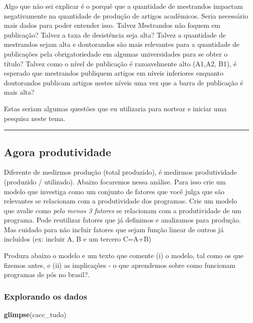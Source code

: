 \documentclass[
]{article}
\newenvironment{Shaded}{\begin{snugshade}}{\end{snugshade}}
\newcommand{\FunctionTok}[1]{\textcolor[rgb]{0.13,0.29,0.53}{\textbf{#1}}}
\newcommand{\NormalTok}[1]{#1}
\begin{document}
Algo que não sei explicar é o porquê que a quantidade de mestrandos
impactam negativamente na quantidade de produção de artigos acadêmicos.
Seria necessário mais dados para poder entender isso. Talvez Mestrandos
não foquem em publicação? Talvez a taxa de desistência seja alta? Talvez
a quantidade de mestrandos sejam alta e doutorandos são mais relevantes
para a quantidade de publicações pela obrigatoriedade em algumas
universidades para se obter o título? Talvez como o nível de publicação
é razoavelmente alto (A1,A2, B1), é esperado que mestrandos publiquem
artigos em níveis inferiores enquanto doutorandos publicam artigos
nestes níveis uma vez que a barra de publicação é mais alta?

Estas seriam algumas questões que eu utilizaria para nortear e iniciar
uma pesquisa neste tema.

\begin{center}\rule{0.5\linewidth}{0.5pt}\end{center}

\hypertarget{agora-produtividade}{%
\subsection{Agora produtividade}\label{agora-produtividade}}

Diferente de medirmos produção (total produzido), é medirmos
produtividade (produzido / utilizado). Abaixo focaremos nessa análise.
Para isso crie um modelo que investiga como um conjunto de fatores que
você julga que são relevantes se relacionam com a produtividade dos
programas. Crie um modelo que avalie como \emph{pelo menos 3 fatores} se
relacionam com a produtividade de um programa. Pode reutilizar fatores
que já definimos e analizamos para produção. Mas cuidado para não
incluir fatores que sejam função linear de outros já incluídos (ex:
incluir A, B e um tercero C=A+B)

Produza abaixo o modelo e um texto que comente (i) o modelo, tal como os
que fizemos antes, e (ii) as implicações - o que aprendemos sobre como
funcionam programas de pós no brasil?.

\hypertarget{explorando-os-dados}{%
\subsubsection{Explorando os dados}\label{explorando-os-dados}}

\begin{Shaded}
\begin{Highlighting}[]
\FunctionTok{glimpse}\NormalTok{(cacc\_tudo)}
\end{Highlighting}
\end{Shaded}
\end{document}
